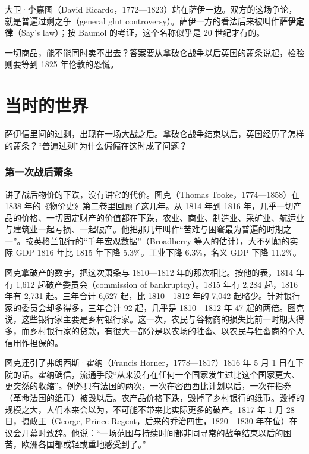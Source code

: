 大卫·李嘉图（David Ricardo，1772—1823）站在萨伊一边。双方的这场争论，就是普遍过剩之争（general glut controversy）。萨伊一方的看法后来被叫作\textbf{萨伊定律}（Say's law）；按 Baumol 的考证，这个名称似乎是 20 世纪才有的\cite{baumol1999}。

一切商品，能不能同时卖不出去？答案要从拿破仑战争以后英国的萧条说起，检验则要等到 1825 年伦敦的恐慌。

\section{当时的世界}\label{sec:say-world}

萨伊信里问的过剩，出现在一场大战之后。拿破仑战争结束以后，英国经历了怎样的萧条？“普遍过剩”为什么偏偏在这时成了问题？

\subsubsection{第一次战后萧条}
讲了战后物价的下跌，没有讲它的代价。图克（Thomas Tooke，1774—1858）在 1838 年的《物价史》第二卷里回顾了这几年。从 1814 年到 1816 年，几乎一切产品的价格、一切固定财产的价值都在下跌，农业、商业、制造业、采矿业、航运业与建筑业一起亏损、一起破产。他把那几年叫作“苦难与困窘最为普遍的时期之一”\cite{tooke1838v2}。按英格兰银行的“千年宏观数据”（Broadberry 等人的估计），大不列颠的实际 GDP 1816 年比 1815 年下降 5.3\%。工业下降 6.3\%，名义 GDP 下降 11.2\%\cite{boe2017,broadberry2015}。

图克拿破产的数字，把这次萧条与 1810—1812 年的那次相比。按他的表，1814 年有 1,612 起破产委员会（commission of bankruptcy）。1815 年有 2,284 起，1816 年有 2,731 起。三年合计 6,627 起，比 1810—1812 年的 7,042 起略少。针对银行家的委员会却多得多，三年合计 92 起，几乎是 1810—1812 年 47 起的两倍\cite{tooke1838v2}。图克说，这些银行家主要是乡村银行家。这一次，农民与谷物商的损失比前一时期大得多，而乡村银行家的贷款，有很大一部分是以农场的牲畜、以农民与牲畜商的个人信用作担保的\cite{tooke1838v2}。

图克还引了弗朗西斯·霍纳（Francis Horner，1778—1817）1816 年 5 月 1 日在下院的话。霍纳确信，流通手段“从来没有在任何一个国家发生过比这个国家更大、更突然的收缩”。例外只有法国的两次，一次在密西西比计划以后，一次在指券（革命法国的纸币）被毁以后。农产品价格下跌，毁掉了乡村银行的纸币。毁掉的规模之大，人们本来会以为，不可能不带来比实际更多的破产\cite{tooke1838v2}。1817 年 1 月 28 日，摄政王（George, Prince Regent，后来的乔治四世，1820—1830 年在位）在议会开幕时致辞。他说：“一场范围与持续时间都非同寻常的战争结束以后的困苦，欧洲各国都或轻或重地感受到了。”\cite{tooke1838v2}

